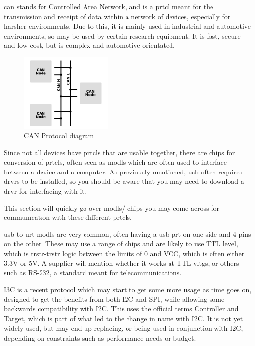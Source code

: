 \documentclass[a4paper,11pt]{report}
\begin{document}
\gls{can} stands for Controlled Area Network, and is a \gls{prtcl} meant for the transmission and receipt of data within a network of devices, especially for harsher environments. Due to this, it is mainly used in industrial and automotive environments, so may be used by certain research equipment. It is fast, secure and low cost, but is complex and automotive orientated.

\begin{figure}[H]
\centering
\includegraphics[width=0.4\textwidth]{CAN}
\caption{CAN Protocol diagram}
\end{figure}

Since not all devices have \gls{prtcl}s that are usable together, there are chips for conversion of \gls{prtcl}s, often seen as \gls{modl}s which are often used to interface between a device and a computer. As previously mentioned, \gls{usb} often requires \gls{drvr}s to be installed, so you should be aware that you may need to download a \gls{drvr} for interfacing with it.

This section will quickly go over \gls{modl}s/ chips you may come across for communication with these different \gls{prtcl}s.

\gls{usb} to \gls{urt} \gls{modl}s are very common, often having a \gls{usb} \gls{prt} on one side and 4 pins on the other. These may use a range of chips and are likely to use TTL level, which is \gls{trstr}-\gls{trstr} logic between the limits of 0 and VCC, which is often either 3.3V or 5V. A supplier will mention whether it works at TTL \gls{vltg}s, or others such as RS-232, a standard meant for telecommunications.

I3C is a recent protocol which may start to get some more usage as time goes on, designed to get the benefits from both I2C and SPI, while allowing some backwards compatibility with I2C. This uses the official terms Controller and Target, which is part of what led to the change in name with I2C. It is not yet widely used, but may end up replacing, or being used in conjunction with I2C, depending on constraints such as performance needs or budget.
\end{document}
